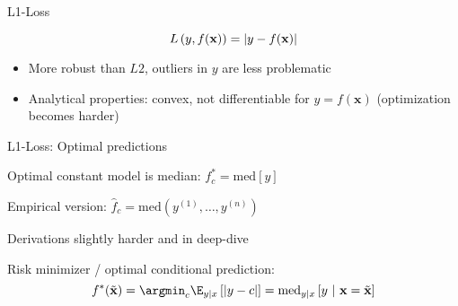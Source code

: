 \documentclass[11pt,compress,t,notes=noshow, xcolor=table]{beamer}
\begin{document}
\begin{frame}{L1-Loss}

$$
L\left(y, f(\mathbf{x})\right) = \left|y-f(\mathbf{x})\right|
$$

\begin{itemize}
\item More robust than $L2$, outliers in $y$ are less problematic
\item Analytical properties: convex, not differentiable for $y = f(\bm{x})$ (optimization becomes harder)
\end{itemize}

\vfill


\end{frame}


\begin{framei}[sep=L]{L1-Loss: Optimal predictions}

\item Optimal constant model is median: 
$f_{c}^{\ast} = \text{med} [y]$

\item Empirical version: $\hat{f}_c = \text{med}(y^{(1)}, \ldots, y^{(n)}) $  

\item Derivations slightly harder and in deep-dive

\item Risk minimizer / optimal conditional prediction:
$$f^{\ast}(\xtil) = \argmin_c \E_{y|x}\left[|y - c|\right]= \text{med}_{y|x} \left[y ~|~ \xv = \xtil \right]
$$

\end{framei}



\endlecture
\end{document}
